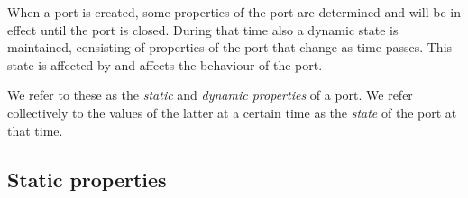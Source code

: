\label{section:port-state}

When a port is created, some properties of the port are determined and will be
in effect until the port is closed.  During that time also a dynamic state
is maintained, consisting of properties of the port that change as time passes.
This state is affected by and affects the behaviour of the port.

We refer to these as the \emph{static} and \emph{dynamic properties} of a port.  We
refer collectively to the values of the latter at a certain time as the \emph{state} of the port
at that time.

\subsection{Static properties}

\label{section:port-state-static}

